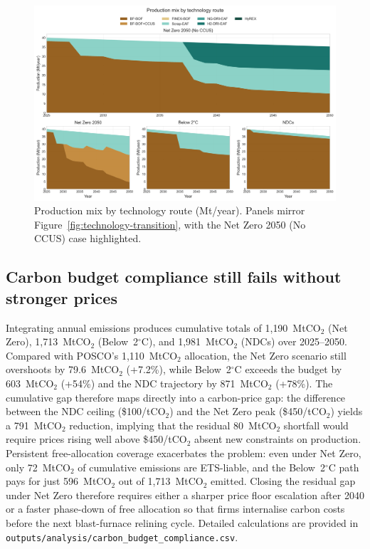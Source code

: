 \documentclass[preprint,1p,authoryear]{elsarticle}
\begin{document}
\begin{figure}[!t]
  \centering
  \includegraphics[width=0.8\linewidth]{production_mix_evolution}
  \caption{Production mix by technology route (Mt/year). Panels mirror Figure~\ref{fig:technology-transition}, with the Net Zero 2050 (No CCUS) case highlighted.}
  \label{fig:production-mix}
\end{figure}

\subsection{Carbon budget compliance still fails without stronger prices}

Integrating annual emissions produces cumulative totals of 1{,}190~MtCO$_2$ (Net Zero), 1{,}713~MtCO$_2$ (Below~2$^\circ$C), and 1{,}981~MtCO$_2$ (NDCs) over 2025--2050. Compared with POSCO's 1{,}110~MtCO$_2$ allocation, the Net Zero scenario still overshoots by 79.6~MtCO$_2$ (+7.2\%), while Below~2$^\circ$C exceeds the budget by 603~MtCO$_2$ (+54\%) and the NDC trajectory by 871~MtCO$_2$ (+78\%). The cumulative gap therefore maps directly into a carbon-price gap: the difference between the NDC ceiling (\$100/tCO$_2$) and the Net Zero peak (\$450/tCO$_2$) yields a 791~MtCO$_2$ reduction, implying that the residual 80~MtCO$_2$ shortfall would require prices rising well above \$450/tCO$_2$ absent new constraints on production. Persistent free-allocation coverage exacerbates the problem: even under Net Zero, only 72~MtCO$_2$ of cumulative emissions are ETS-liable, and the Below~2$^\circ$C path pays for just 596~MtCO$_2$ out of 1,713~MtCO$_2$ emitted. Closing the residual gap under Net Zero therefore requires either a sharper price floor escalation after 2040 or a faster phase-down of free allocation so that firms internalise carbon costs before the next blast-furnace relining cycle. Detailed calculations are provided in \texttt{outputs/analysis/carbon\_budget\_compliance.csv}.
\end{document}
